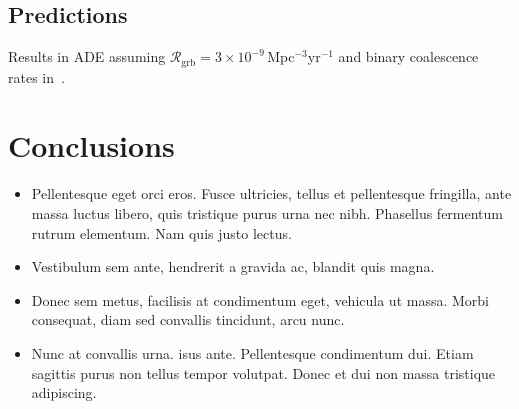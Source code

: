 \documentclass[a0,landscape]{a0poster}
\newcommand{\grbrate}{{{\mathcal R}_{\mathrm{grb}}}}
\begin{document}
\begin{multicols}{4}
\subsection*{Predictions}

\begin{minipage}{\columnwidth}
  \makeatletter
  \newcommand{\@captype}{figure}
  \makeatother
  \centering
  \qquad%
  \caption{Results in ADE assuming $\grbrate =
      3\times10^{-9}$\,Mpc$^{-3}$yr$^{-1}$ and binary coalescence rates
  in~\cite{scenarios}.}
\end{minipage}


\color{SaddleBrown} %

\section*{Conclusions}

\begin{itemize}
\item Pellentesque eget orci eros. Fusce ultricies, tellus et pellentesque fringilla, ante massa luctus libero, quis tristique purus urna nec nibh. Phasellus fermentum rutrum elementum. Nam quis justo lectus.
\item Vestibulum sem ante, hendrerit a gravida ac, blandit quis magna.
\item Donec sem metus, facilisis at condimentum eget, vehicula ut massa. Morbi consequat, diam sed convallis tincidunt, arcu nunc.
\item Nunc at convallis urna. isus ante. Pellentesque condimentum dui. Etiam sagittis purus non tellus tempor volutpat. Donec et dui non massa tristique adipiscing.
\end{itemize}


\end{multicols}
\end{document}
